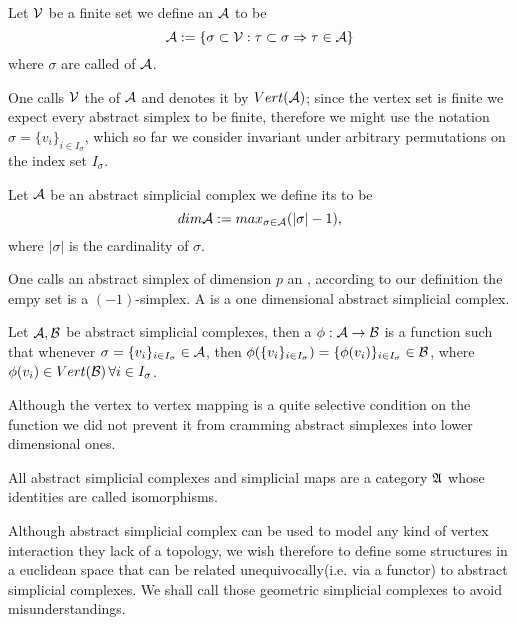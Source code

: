 \documentclass[../1.tex]{subfiles}
\begin{document}
    \begin{defn}
        Let $\mathcal{V}$ be a finite set we define an  $\mathcal{A}$ to be 
        \[\mathcal{A}:=\{ \sigma  \subset \mathcal{V} : \tau \subset \sigma \Rightarrow \tau \in \mathcal{A} \}\] 
        where $\sigma$ are called  of $\mathcal{A}$.
    \end{defn}
    
    One calls $\mathcal{V}$ the  of $\mathcal{A}$ and denotes it by $Vert(\mathcal{A})$; since the vertex
    set is finite we expect every abstract simplex to be finite, therefore we might use the notation $\sigma = \{ v_i \}_{i \in I_\sigma}$,
    which so far we consider invariant under arbitrary permutations on the index set $I_\sigma$.

    \begin{defn}
        Let $\mathcal{A}$ be an abstract simplicial complex we define its  to be
        \[ dim \mathcal{A} := max_{\sigma \in \mathcal{A}}(|\sigma|-1), \]
        where $|\sigma|$ is the cardinality of $\sigma$.
    \end{defn}

    One calls an abstract simplex of dimension $p$ an , according to our
    definition the empy set is a $(-1)$-simplex. A  is a one dimensional abstract simplicial complex.

    \begin{defn}
        Let $\mathcal{A},\mathcal{B}$ be abstract simplicial complexes, then a  $\phi : \mathcal{A} \to \mathcal{B}$ is a function 
        such that whenever $\sigma = \{v_i\}_{i \in I_\sigma} \in \mathcal{A}$, then $\phi(\{v_i\}_{i \in I_\sigma}) = \{\phi(v_i)\}_{i \in I_\sigma} \in \mathcal{B}$,
        where $\phi(v_i) \in Vert(\mathcal{B}) \, \forall i \in I_\sigma$.
    \end{defn}

    Although the vertex to vertex mapping is a quite selective condition on the function we did not prevent it from cramming
    abstract simplexes into lower dimensional ones.

    \begin{thm}
        All abstract simplicial complexes and simplicial maps are a category $\mathfrak{A}$ whose identities are called isomorphisms.
    \end{thm}

    Although abstract simplicial complex can be used to model any kind of vertex interaction they lack of a topology, we wish
    therefore to define some structures in a euclidean space that can be related unequivocally(i.e. via a functor) to abstract simplicial complexes.
    We shall call those geometric simplicial complexes to avoid misunderstandings.
        
\end{document}
